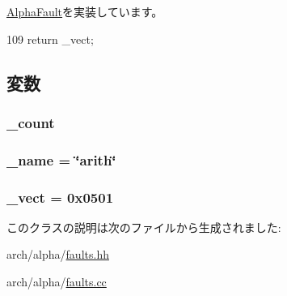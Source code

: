 \hyperlink{classAlphaISA_1_1AlphaFault_ac141ef2ab527bd4d5c079ddff2e8b4aa}{AlphaFault}を実装しています。


\begin{DoxyCode}
109 {return _vect;}
\end{DoxyCode}


\subsection{変数}
\hypertarget{classAlphaISA_1_1ArithmeticFault_a4bff925c412f331c5aaf6a39b79619ff}{
\subsubsection[{\_\-count}]{ {\bf \_\-count}}}
\label{classAlphaISA_1_1ArithmeticFault_a4bff925c412f331c5aaf6a39b79619ff}
\hypertarget{classAlphaISA_1_1ArithmeticFault_ac79073ffcd2c66a09bcd3bd3ad206019}{
\subsubsection[{\_\-name}]{ {\bf \_\-name} = \char`\"{}arith\char`\"{}}}
\label{classAlphaISA_1_1ArithmeticFault_ac79073ffcd2c66a09bcd3bd3ad206019}
\hypertarget{classAlphaISA_1_1ArithmeticFault_ad9e5855b9db0b2824cf6c507be4a872e}{
\subsubsection[{\_\-vect}]{ {\bf \_\-vect} = 0x0501}}
\label{classAlphaISA_1_1ArithmeticFault_ad9e5855b9db0b2824cf6c507be4a872e}


このクラスの説明は次のファイルから生成されました:\begin{DoxyCompactItemize}
\item 
arch/alpha/\hyperlink{arch_2alpha_2faults_8hh}{faults.hh}\item 
arch/alpha/\hyperlink{arch_2alpha_2faults_8cc}{faults.cc}\end{DoxyCompactItemize}
